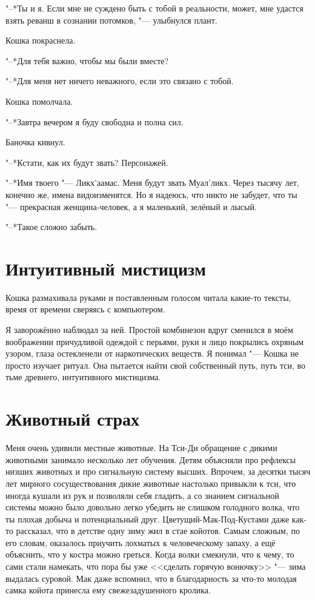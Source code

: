 \documentclass[a4paper,10pt]{book}
\begin{document}
"--*Ты и я. Если мне не суждено быть с тобой в реальности, может, мне удастся взять реванш в сознании потомков, "--- улыбнулся плант.

Кошка покраснела.

"--*Для тебя важно, чтобы мы были вместе?

"--*Для меня нет ничего неважного, если это связано с тобой.

Кошка помолчала.

"--*Завтра вечером я буду свободна и полна сил.

Баночка кивнул.

"--*Кстати, как их будут звать? Персонажей.

"--*Имя твоего "--- Ликх'аамас. Меня будут звать Муал'ликх. Через тысячу лет, конечно же, имена видоизменятся. Но я надеюсь, что никто не забудет, что ты "--- прекрасная женщина-человек, а я маленький, зелёный и лысый.

"--*Такое сложно забыть.

\section{Интуитивный мистицизм}
 
Кошка размахивала руками и поставленным голосом читала какие-то тексты, время 
от времени сверяясь с компьютером.

Я заворожённо наблюдал за ней. Простой комбинезон вдруг сменился в моём 
воображении причудливой одеждой с перьями, руки и лицо покрылись охряным 
узором, глаза остекленели от наркотических веществ. Я понимал "--- Кошка не 
просто изучает ритуал. Она пытается найти свой собственный путь, путь тси, во 
тьме древнего, интуитивного мистицизма.
 
\section{Животный страх}

Меня очень удивили местные животные. На Тси-Ди обращение с дикими животными 
занимало несколько лет обучения. Детям объясняли про рефлексы низших животных и 
про сигнальную систему высших. Впрочем, за десятки тысяч лет мирного 
сосуществования дикие животные настолько привыкли к тси, что иногда кушали из 
рук и позволяли себя гладить, а со знанием сигнальной системы можно было 
довольно легко убедить не слишком голодного волка, что ты плохая добыча и 
потенциальный друг. Цветущий-Мак-Под-Кустами даже как-то рассказал, что в 
детстве одну зиму жил в стае койотов. Самым сложным, по его словам, оказалось 
приучить лохматых к человеческому запаху, а ещё объяснить, что у костра можно 
греться. Когда волки смекнули, что к чему, то сами стали намекать, что пора бы 
уже <<сделать горячую вонючку>> "--- зима выдалась суровой. Мак даже вспомнил, 
что в благодарность за что-то молодая самка койота принесла ему 
свежезадушенного кролика.
\end{document}
